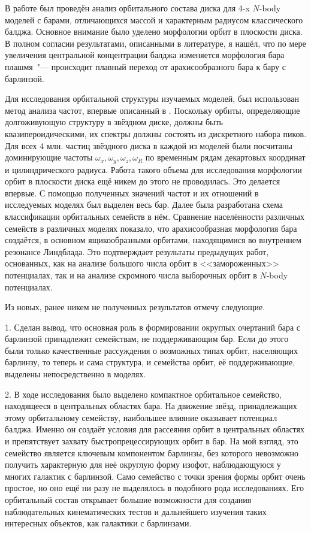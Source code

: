 \documentclass{trlnotes}
\begin{document}
В работе был проведён анализ орбитального состава диска для 4-x $N$-body моделей с барами,
отличающихся массой и характерным радиусом классического балджа. Основное внимание было уделено морфологии орбит в плоскости диска. 
В полном согласии результатами, описанными в литературе, я нашёл, что по мере увеличения центральной концентрации балджа изменяется морфология бара плашмя~"--- происходит плавный переход от арахисообразного бара к 
бару с барлинзой.

Для исследования орбитальной структуры изучаемых моделей, был использован метод анализа частот, впервые описанный в \citet{binney1982}.
Поскольку орбиты, определяющие долгоживующую структуру в звёздном диске, должны быть квазипероидическими, их спектры должны состоять из
дискретного набора пиков. Для всех 4 млн. частиц звёздного диска в каждой из моделей были посчитаны доминирующие частоты
$ω_x, ω_y, ω_z, ω_R$ по временным рядам декартовых координат и цилиндрического радиуса. Работа такого объема для исследования морфологии орбит в плоскости диска ещё никем до этого не проводилась. Это делается впервые. 
С помощью полученных значений частот и их отношений в исследуемых моделях был выделен весь бар. Далее была разработана схема классификации орбитальных семейств в нём.
Сравнение населённости различных семейств в различных моделях показало, что арахисообразная морфология бара создаётся, в 
основном ящикообразными орбитами, находящимися во внутреннем резонансе Линдблада. Это подтверждает результаты предыдущих работ, основанных, как на анализе большого числа орбит в <<замороженных>> потенциалах, так и на анализе скромного числа выборочных орбит в $N$-body потенциалах. 

Из новых, ранее никем не полученных результатов отмечу следующие.

1. Сделан вывод, что основная роль в формировании округлых очертаний бара с барлинзой принадлежит семействам, не поддерживающим бар. Если до этого были только качественные рассуждения о возможных типах орбит, населяющих барлинзу, то теперь и сама структура, и семейства орбит, её поддерживающие, выделены непосредственно в моделях.

2. В ходе исследования было выделено компактное орбитальное семейство, находящееся в центральных областях бара.  На движение звёзд, принадлежащих этому орбитальному семейству, наибольшее влияние оказывает потенциал балджа. Именно он создаёт условия для рассеяния орбит в центральных областях и препятствует захвату быстропрецессирующих орбит в бар. На мой взгляд, это семейство является ключевым компонентом барлинзы, без
которого невозможно получить характерную для неё округлую форму изофот, наблюдающуюся у многих галактик с барлинзой. Само семейство с точки зрения формы орбит очень простое, но оно ещё ни разу не выделялось в подобного рода исследованиях. Его орбитальный состав открывает большие возможности для создания наблюдательных кинематических тестов и дальнейшего изучения таких интересных объектов, как галактики с барлинзами.
\end{document}
